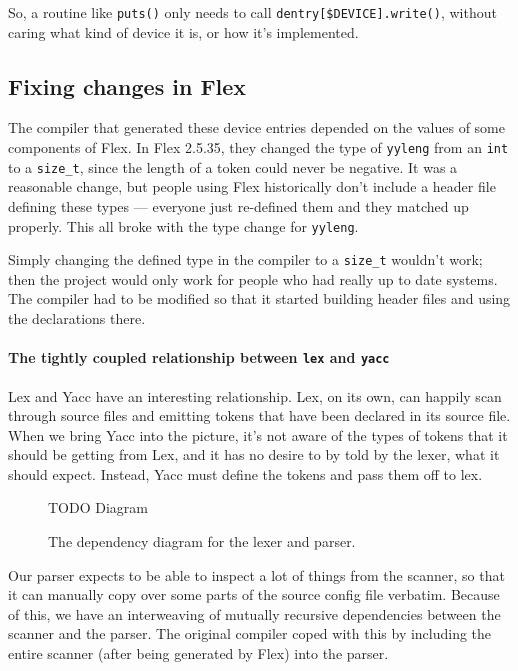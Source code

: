 \documentclass[12pt]{article}
\newcommand{\TODO}[1]{{\huge\color{red}TODO \Large #1}}
\newcommand{\code}[1]{{\tt #1}}
\begin{document}
So, a routine like \code{puts()} only needs to call
\code{dentry[\$DEVICE].write()}, without caring what kind of device it is, or
how it's implemented.

\subsection{Fixing changes in Flex}

The compiler that generated these device entries depended on the values of some
components of Flex. In Flex 2.5.35, they changed the type of \code{yyleng} from
an \code{int} to a \code{size\_t}, since the length of a token could never be
negative. It was a reasonable change, but people using Flex historically don't
include a header file defining these types \---- everyone just re-defined them
and they matched up properly. This all broke with the type change for
\code{yyleng}.

Simply changing the defined type in the compiler to a \code{size\_t} wouldn't
work; then the project would only work for people who had really up to date
systems. The compiler had to be modified so that it started building header
files and using the declarations there.

\paragraph{The tightly coupled relationship between \code{lex} and \code{yacc}}
Lex and Yacc have an interesting relationship. Lex, on its own, can happily scan
through source files and emitting tokens that have been declared in its source
file. When we bring Yacc into the picture, it's not aware of the types of
tokens that it should be getting from Lex, and it has no desire to by told by
the lexer, what it should expect. Instead, Yacc must define the tokens and pass
them off to lex.

\begin{figure}
\caption{The dependency diagram for the lexer and parser.}
\label{lex-yacc-dependencies}
\TODO{Diagram}
\end{figure}

Our parser expects to be able to inspect a lot of things from the scanner, so
that it can manually copy over some parts of the source config file verbatim.
Because of this, we have an interweaving of mutually recursive dependencies
between the scanner and the parser. The original compiler coped with this by
including the entire scanner (after being generated by Flex) into the parser.
\end{document}
